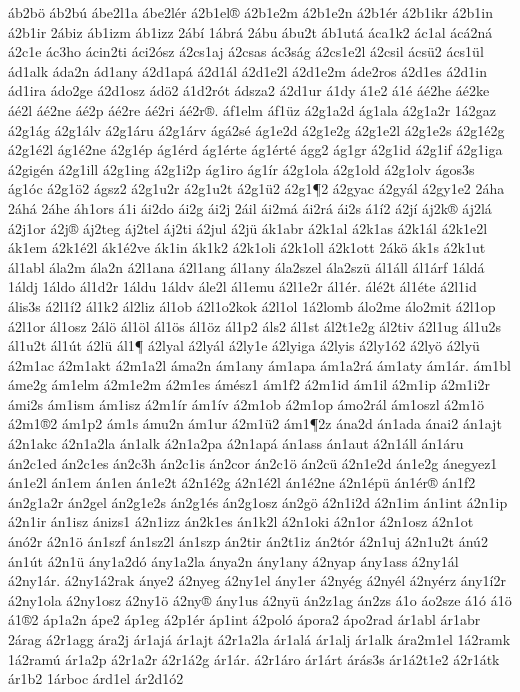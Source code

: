 {áb2bö
áb2bú
ábe2l1a
ábe2lér
á2b1el®
á2b1e2m
á2b1e2n
á2b1ér
á2b1ikr
á2b1in
á2b1ir
2ábiz
áb1izm
áb1izz
2ábí
1ábrá
2ábu
ábu2t
áb1utá
áca1k2
ác1al
ácá2ná
á2c1e
ác3ho
ácin2ti
áci2ósz
á2cs1aj
á2csas
ác3ság
á2cs1e2l
á2csil
ácsü2
ács1ül
ád1alk
áda2n
ád1any
á2d1apá
á2d1ál
á2d1e2l
á2d1e2m
áde2ros
á2d1es
á2d1in
ád1ira
ádo2ge
á2d1osz
ádö2
á1d2rót
ádsza2
á2d1ur
á1dy
á1e2
á1é
áé2he
áé2ke
áé2l
áé2ne
áé2p
áé2re
áé2ri
áé2r®.
áf1elm
áf1üz
á2g1a2d
ág1ala
á2g1a2r
1á2gaz
á2g1ág
á2g1álv
á2g1áru
á2g1árv
ágá2sé
ág1e2d
á2g1e2g
á2g1e2l
á2g1e2s
á2g1é2g
á2g1é2l
ág1é2ne
á2g1ép
ág1érd
ág1érte
ág1érté
ágg2
ág1gr
á2g1id
á2g1if
á2g1iga
á2gigén
á2g1ill
á2g1ing
á2g1i2p
ág1iro
ág1ír
á2g1ola
á2g1old
á2g1olv
ágos3s
ág1óc
á2g1ö2
ágsz2
á2g1u2r
á2g1u2t
á2g1ü2
á2g1¶2
á2gyac
á2gyál
á2gy1e2
2áha
2áhá
2áhe
áh1ors
á1i
ái2do
ái2g
ái2j
2áil
ái2má
ái2rá
ái2s
á1í2
á2jí
áj2k®
áj2lá
á2j1or
á2j®
áj2teg
áj2tel
áj2ti
á2jul
á2jü
ák1abr
á2k1al
á2k1as
á2k1ál
á2k1e2l
ák1em
á2k1é2l
ák1é2ve
ák1in
ák1k2
á2k1oli
á2k1oll
á2k1ott
2ákö
ák1s
á2k1ut
ál1abl
ála2m
ála2n
á2l1ana
á2l1ang
ál1any
ála2szel
ála2szü
ál1áll
ál1árf
1áldá
1áldj
1áldo
ál1d2r
1áldu
1áldv
ále2l
ál1emu
á2l1e2r
ál1ér.
álé2t
ál1éte
á2l1id
ális3s
á2l1í2
ál1k2
ál2liz
ál1ob
á2l1o2kok
á2l1ol
1á2lomb
álo2me
álo2mit
á2l1op
á2l1or
ál1osz
2álö
ál1öl
ál1ös
ál1öz
ál1p2
áls2
ál1st
ál2t1e2g
ál2tiv
á2l1ug
ál1u2s
ál1u2t
ál1út
á2lü
ál1¶
á2lyal
á2lyál
á2ly1e
á2lyiga
á2lyis
á2ly1ó2
á2lyö
á2lyü
á2m1ac
á2m1akt
á2m1a2l
áma2n
ám1any
ám1apa
ám1a2rá
ám1aty
ám1ár.
ám1bl
áme2g
ám1elm
á2m1e2m
á2m1es
ámész1
ám1f2
á2m1id
ám1il
á2m1ip
á2m1i2r
ámi2s
ám1ism
ám1isz
á2m1ír
ám1ív
á2m1ob
á2m1op
ámo2rál
ám1oszl
á2m1ö
á2m1®2
ám1p2
ám1s
ámu2n
ám1ur
á2m1ü2
ám1¶2z
ána2d
án1ada
ánai2
án1ajt
á2n1akc
á2n1a2la
án1alk
á2n1a2pa
á2n1apá
án1ass
án1aut
á2n1áll
án1áru
án2c1ed
án2c1es
án2c3h
án2c1is
án2cor
án2c1ö
án2cü
á2n1e2d
án1e2g
ánegyez1
án1e2l
án1em
án1en
án1e2t
á2n1é2g
á2n1é2l
án1é2ne
á2n1épü
án1ér®
án1f2
án2g1a2r
án2gel
án2g1e2s
án2g1és
án2g1osz
án2gö
á2n1i2d
á2n1im
án1int
á2n1ip
á2n1ir
án1isz
ánizs1
á2n1izz
án2k1es
án1k2l
á2n1oki
á2n1or
á2n1osz
á2n1ot
ánó2r
á2n1ö
án1szf
án1sz2l
án1szp
án2tir
án2t1iz
án2tór
á2n1uj
á2n1u2t
ánú2
án1út
á2n1ü
ány1a2dó
ány1a2la
ánya2n
ány1any
á2nyap
ány1ass
á2ny1ál
á2ny1ár.
á2ny1á2rak
ánye2
á2nyeg
á2ny1el
ány1er
á2nyég
á2nyél
á2nyérz
ány1í2r
á2ny1ola
á2ny1osz
á2ny1ö
á2ny®
ány1us
á2nyü
án2z1ag
án2zs
á1o
áo2sze
á1ó
á1ö
á1®2
áp1a2n
ápe2
áp1eg
á2p1ér
áp1int
á2poló
ápora2
ápo2rad
ár1abl
ár1abr
2árag
á2r1agg
ára2j
ár1ajá
ár1ajt
á2r1a2la
ár1alá
ár1alj
ár1alk
ára2m1el
1á2ramk
1á2ramú
ár1a2p
á2r1a2r
á2r1á2g
ár1ár.
á2r1áro
ár1árt
árás3s
ár1á2t1e2
á2r1átk
ár1b2
1árboc
árd1el
ár2d1ó2
}
